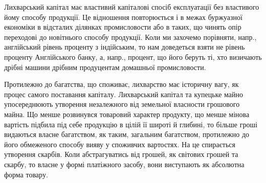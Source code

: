 Лихварський капітал має властивий капіталові спосіб експлуатації без
властивого йому способу продукції. Це відношення повторюється і в межах буржуазної
економіки в відсталих ділянках промисловости або в таких, що чинять
опір переходові до новітнього способу продукції. Коли ми захочемо порівняти,
напр., англійський рівень проценту з індійським, то нам доведеться взяти не
рівень проценту Англійського банку, а, напр., процент, що його беруть ті, хто
визичають дрібні машини дрібним продуцентам домашньої промисловости.

Протилежно до багатства, що споживає, лихварство має історичну вагу,
як процес самого поставання капіталу. Лихварський капітал та купецьке
майно упосереднюють утворення незалежного від земельної власности грошового
майна. Що менше розвинувся товаровий характер продукту, що менше мінова
вартість підбила під себе продукцію в цілій її широті й глибині, то більше гроші видаються
власне багатством, як таким, загальним багатством, протилежно до його
обмеженого способу вияву у споживчих вартостях. На це спирається утворення
скарбів. Коли абстрагуватись від грошей, як світових грошей та скарбу, то
власне у формі платіжного засобу, вони виступають як абсолютна форма товару.
